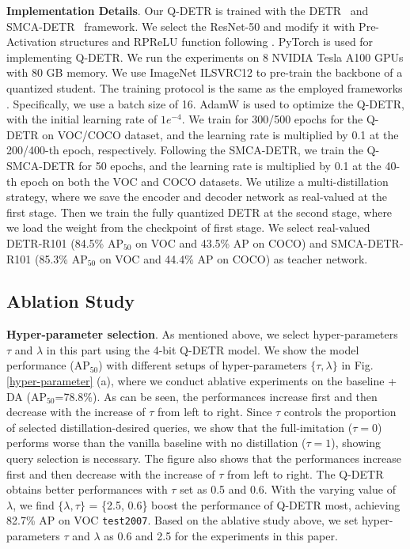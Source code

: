 \documentclass[10pt,twocolumn,letterpaper]{article}
\begin{document}
\textbf{Implementation Details}. 
Our Q-DETR is trained with the DETR~\cite{carion2020end} and SMCA-DETR~\cite{gao2021fast} framework. We select the ResNet-50 \cite{he2016deep} and modify it with Pre-Activation structures and RPReLU \cite{liu2020reactnet} function following \cite{liu2022nonuniform}. PyTorch \cite{paszke2017automatic} is used for implementing Q-DETR. We run the experiments on 8 NVIDIA Tesla A100 GPUs with $80$ GB memory. We use ImageNet ILSVRC12 \cite{imagenet12} to pre-train the backbone of a quantized student. The training protocol is the same as the employed frameworks \cite{carion2020end, gao2021fast}. 
Specifically, we use a batch size of 16. AdamW \cite{loshchilov2017decoupled} is used to optimize the Q-DETR, with the initial learning rate of $1e^{-4}$.
We train for 300/500 epochs for the Q-DETR on VOC/COCO dataset, and the learning rate is multiplied by 0.1 at the 200/400-th epoch, respectively. Following the SMCA-DETR, we train the Q-SMCA-DETR for 50 epochs, and the learning rate is multiplied by 0.1 at the 40-th epoch on both the VOC and COCO datasets. We utilize a multi-distillation strategy, where we save the encoder and decoder network as real-valued at the first stage. Then we train the fully quantized DETR at the second stage, where we load the weight from the checkpoint of first stage. 
%
We select real-valued DETR-R101 (84.5\% AP$_{50}$ on VOC and 43.5\% AP on COCO) and SMCA-DETR-R101 (85.3\% AP$_{50}$ on VOC and 44.4\% AP on COCO) as teacher network. 


\subsection{Ablation Study}

\textbf{Hyper-parameter selection}.  
As mentioned above, we select hyper-parameters $\tau$ and $\lambda$ in this part using the 4-bit Q-DETR model. We show the model performance (AP$_{50}$) with different setups of hyper-parameters $\{\tau,\lambda\}$ in Fig.\,\ref{hyper-parameter} (a), where we conduct ablative experiments on the baseline + DA (AP$_{50}$=78.8\%).
As can be seen, the performances increase first and then decrease with the increase of $\tau$ from left to right. Since $\tau$ controls the proportion of selected distillation-desired queries, we show that the full-imitation ($\tau=0$) performs worse than the vanilla baseline with no distillation ($\tau=1$), showing query selection is necessary. The figure also shows that the performances increase first and then decrease with the increase of $\tau$ from left to right. The Q-DETR obtains better performances with $\tau$ set as 0.5 and 0.6. 
With the varying value of $\lambda$, we find $\{\lambda,\tau\}$ = \{2.5, 0.6\} boost the performance of Q-DETR most, achieving 82.7\% AP on VOC {\tt test2007}. Based on the ablative study above, we set hyper-parameters $\tau$ and $\lambda$ as 0.6 and 2.5 for the experiments in this paper.
\end{document}
